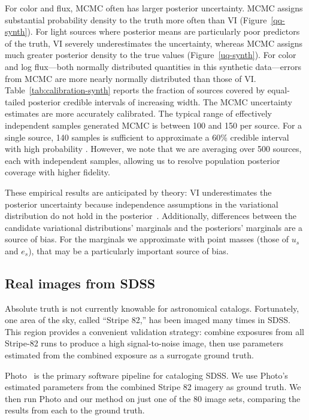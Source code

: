 For color and flux, MCMC often has larger posterior uncertainty.
MCMC assigns substantial probability density to the truth more often than VI (Figure~\ref{qq-synth}).
For light sources where posterior means are particularly poor predictors of the truth, VI severely underestimates the uncertainty, whereas MCMC assigns much greater posterior density to the true values (Figure~\ref{uq-synth}).
For color and log flux---both normally distributed quantities in this synthetic data---errors from MCMC are more nearly normally distributed than those of VI.
Table~\ref{tab:calibration-synth} reports the fraction of sources covered by equal-tailed posterior credible intervals of increasing width. The MCMC uncertainty estimates are more accurately calibrated.
The typical range of effectively independent samples generated MCMC is between 100 and 150 per source.
For a single source, 140 samples is sufficient to approximate a 60\% credible interval with high probability \citep{booth1998monte}.
However, we note that we are averaging over 500 sources, each with independent samples, allowing us to resolve population posterior coverage with higher fidelity.

These empirical results are anticipated by theory: VI underestimates the posterior uncertainty because independence assumptions in the variational distribution do not hold in the posterior~\citep{bishop2006pattern}. Additionally, differences between the candidate variational distributions' marginals and the posteriors' marginals are a source of bias. For the marginals we approximate with point masses (those of $u_s$ and $e_s$), that may be a particularly important source of bias.


\subsection{Real images from SDSS}
\label{sec:real}

Absolute truth is not currently knowable for astronomical catalogs. Fortunately, one area of the sky, called ``Stripe 82,'' has been imaged many times in SDSS.
This region provides a convenient validation strategy: combine exposures from all Stripe-82 runs to produce a high signal-to-noise image, then use parameters estimated from the combined exposure as a surrogate ground truth.

Photo~\citep{lupton2005sdss} is the primary software pipeline for cataloging SDSS.
We use Photo's estimated parameters from the combined Stripe 82 imagery as ground truth.
We then run Photo and our method on just one of the 80 image sets, comparing the results from each to the ground truth.

